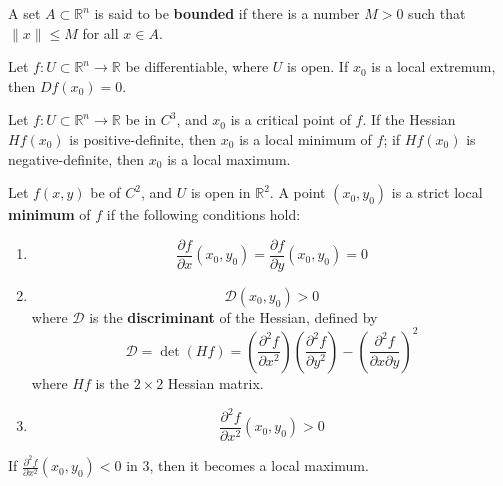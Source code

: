 \documentclass[openany]{book}
\newcommand{\R}{\mathbb{R}}
\begin{document}

\begin{defn}
    A set $A\subset\R^n$ is said to be \textbf{bounded} if there is a number $M>0$ such that $\|x\|\leq M$ for all $x\in A$. 
\end{defn}




\begin{prop}
    Let $f:U\subset\R^n\to\R$ be differentiable, where $U$ is open. If $x_0$ is a local extremum, then $Df(x_0)=0$. 
\end{prop}


\begin{prop}[extremum]
    Let $f\colon U\subset\R^n\to\R$ be in $C^3$, and $x_0$ is a critical point of $f$. If the Hessian $Hf(x_0)$ is positive-definite, then $x_0$ is a local minimum of $f$; if $Hf(x_0)$ is negative-definite, then $x_0$ is a local maximum.
\end{prop}




\begin{prop}
    Let $f(x,y)$ be of $C^2$, and $U$ is open in $\R^2$. A point $(x_0,y_0)$ is a strict local \textbf{minimum} of $f$ if the following conditions hold:
    \begin{enumerate}
        \item \begin{equation*}
            \frac{\partial f}{\partial x}(x_0,y_0)=\frac{\partial f}{\partial y}(x_0,y_0)=0
        \end{equation*}
        \item \begin{equation*}
            \mathcal{D}(x_0,y_0)>0
        \end{equation*}
        where $\mathcal{D}$ is the \textbf{discriminant} of the Hessian, defined by 
        \begin{equation*}
            \mathcal{D}=\det (Hf)=\left(\frac{\partial^2 f}{\partial x^2}\right)\left(\frac{\partial^2 f}{\partial y^2}\right)-\left(\frac{\partial^2 f}{\partial x\partial y}\right)^2
        \end{equation*}
        where $Hf$ is the $2\times 2$ Hessian matrix.
        \item  \begin{equation*}
            \frac{\partial^2f}{\partial x^2}(x_0,y_0)>0
        \end{equation*}
    \end{enumerate}
    If $ \frac{\partial^2f}{\partial x^2}(x_0,y_0)<0$ in 3, then it becomes a local maximum.
\end{prop}
\end{document}
